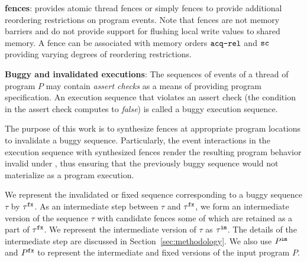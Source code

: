 \noindent
{\bf \cc fences}: \cc provides atomic thread fences or simply 
fences to provide additional reordering restrictions on program 
events. Note that \cc fences are not memory barriers and do not
provide support for flushing local write values to shared memory.
%
A fence can be associated with memory orders $\acqrel$ and $\sc$
providing varying degrees of reordering restrictions.


\noindent
{\bf Buggy and invalidated executions}: The sequences of events of a 
thread of 
program $P$ may contain {\em assert checks} as a means of providing
program specification. An execution sequence that violates an 
assert check (\ie the condition in the assert check computes to
{\em false}) is called a buggy execution sequence.

The purpose of this work is to synthesize \cc fences at appropriate
program locations to invalidate a buggy sequence. Particularly, the
event interactions in the execution sequence with synthesized fences
render the resulting program behavior invalid under \cc, thus ensuring
that the previously buggy sequence would not materialize as a 
\cc program execution.

We represent the invalidated or fixed sequence corresponding to a 
buggy sequence $\tau$ by $\fx{\tau}$. 
%
As an intermediate step between $\tau$ and $\fx{\tau}$, we form an 
intermediate version of the sequence $\tau$ with candidate fences
some of which are retained as a part of $\fx{\tau}$. We represent
the intermediate version of $\tau$ as $\im{\tau}$. The details
of the intermediate step are discussed in Section~\ref{sec:methodology}.
%
We also use $\im{P}$ and $\fx{P}$ to represent the intermediate and
fixed versions of the input program $P$.
